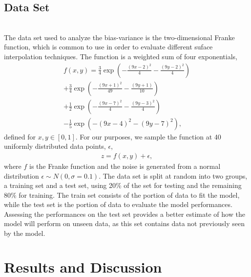 \documentclass[reprint,english,notitlepage]{revtex4-1}  %
\begin{document}
\subsection*{Data Set}
\vspace{3mm}
\\
The data set used to analyze the bias-variance is the two-dimensional Franke function, which is common to use in order to evaluate different suface interpolation techniques. The function is a weighted sum of four exponentials, 
\begin{align}\label{eq: frankie}
    f(x,y) = \frac{3}{4} \exp\left(
             -\frac{{\left( 9x-2\right)}^2}{4}
             -\frac{{\left( 9y-2\right)}^2}{4}
             \right) \nonumber 
             \\ 
            +\frac{3}{4} \exp\left(
             -\frac{{\left( 9x+1\right)}^2}{49}
             -\frac{{\left( 9y+1\right)}}{10}
             \right) \nonumber
             \\ 
            +\frac{1}{2} \exp\left(
             -\frac{{\left( 9x-7\right)}^2}{4}
             -\frac{{\left( 9y-3\right)}^2}{4}
             \right) \nonumber
             \\ 
            -\frac{1}{5} \exp\left(
            -{\left(9x-4\right)}^2 - {\left(9y-7\right)}^2
             \right), \nonumber
\end{align}
defined for $x,y\in [0,1]$. 
For our purposes, we sample the function at 40 uniformly distributed data points, $\epsilon$, 
\begin{align*}
    z = f(x,y) + \epsilon, 
\end{align*}
where $f$ is the Franke function and the noise is generated from a normal distribution $\epsilon\sim N(0,\sigma=0.1)$. 
The data set is split at random into two groups, a training set and a test set, using 20\% of the set for testing and the remaining 80\% for training. The train set consists of the portion of data to fit the model, while the test set is the portion of data to evaluate the model performances. Assessing the performances on the test set provides a better estimate of how the model will perform on unseen data, as this set contains data not previously seen by the model. 



\section{Results and Discussion}\label{sec: results}
\end{document}
